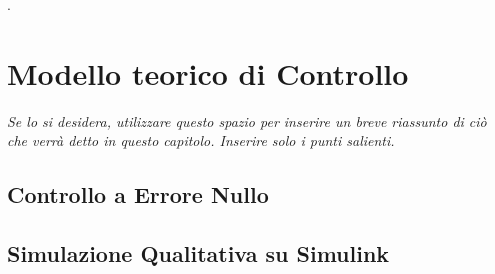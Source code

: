 .\chapter{Modello teorico di Controllo}\label{cap:controlModel}

\begin{minipage}{12cm}\textit{Se lo si desidera, utilizzare questo spazio per inserire un breve riassunto di ci\`o che verr\`a detto in questo capitolo. Inserire solo i punti salienti.}
\end{minipage}

\vspace*{1cm}



\section{Controllo a Errore Nullo}

\section{Simulazione Qualitativa su Simulink}